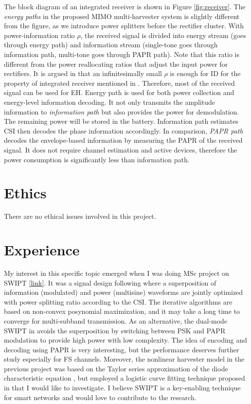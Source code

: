 \documentclass[conference]{IEEEtran}
\begin{document}
The block diagram of an integrated receiver is shown in Figure \ref{fig:receiver}. The \textit{energy paths} in the proposed MIMO multi-harvester system is slightly different from the figure, as we introduce power splitters before the rectifier cluster. With power-information ratio $\rho $, the received signal is divided into energy stream (goes through energy path) and information stream (single-tone goes through information path, multi-tone goes through PAPR path). Note that this ratio is different from the power reallocating ratios that adjust the input power for rectifiers. It is argued in \cite{Park2018} that an infinitesimally small $\rho $ is enough for ID for the property of integrated receiver mentioned in \cite{Zhou2013}. Therefore, most of the received signal can be used for EH. Energy path is used for both power collection and energy-level information decoding. It not only transmits the amplitude information to \textit{information path} but also provides the power for demodulation. The remaining power will be stored in the battery. Information path estimates CSI then decodes the phase information accordingly. In comparison, \textit{PAPR path} decodes the envelope-based information by measuring the PAPR of the received signal. It does not require channel estimation and active devices, therefore the power consumption is significantly less than information path.

\section{Ethics}
There are no ethical issues involved in this project.

\section{Experience}
My interest in this specific topic emerged when I was doing MSc project on SWIPT \href{https://github.com/SnowzTail/signal-optimization-for-wireless-information-and-power-transmission}{[link]}. It was a signal design following \cite{Clerckx2018} where a superposition of information (modulated) and power (multisine) waveforms are jointly optimized with power splitting ratio according to the CSI. The iterative algorithms are based on non-convex posynomial maximization, and it may take a long time to converge for multi-subband transmission. As an alternative, the dual-mode SWIPT in \cite{Park2018} avoids the superposition by switching between PSK and PAPR modulation to provide high power with low complexity. The idea of encoding and decoding using PAPR is very interesting, but the performance deserves further study especially for FS channels. Moreover, the nonlinear harvester model in the previous project was based on the Taylor series approximation of the diode characteristic equation \cite{Clerckx2016}, but \cite{Park2018} employed a logistic curve fitting technique proposed in \cite{Boshkovska2015} that I would like to investigate. I believe SWIPT is a key-enabling technique for smart networks and would love to contribute to the research.



\end{document}
